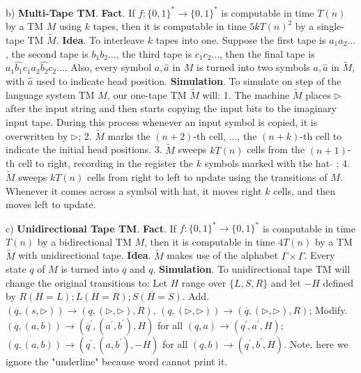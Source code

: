 \documentclass[10pt,a4paper]{article}
\begin{document}
b) \textbf{Multi-Tape TM}.
\textbf{Fact}. If \(f:\{0,1\}^{*} \to \{0,1\}^{*}\) is computable in time \(T(n)\) by a TM \(M\) using \(k\) tapes, then it is computable in time \(5k T(n)^2\) by a single-tape TM \(\tilde{M}\).
\textbf{Idea}. To interleave \(k\) tapes into one. Suppose the first tape is \(a_1 a_2 ...\), the second tape is \(b_1 b_2 ...\), the third tape is \(c_1 c_2 ...\), then the final tape is \(a_1 \hat{b_1} c_1 a_2 \hat{b_2} c_2 ...\). Also, every symbol \(a, \hat{a}\) in \(M\) is turned into two symbols \(a, \hat{a}\) in \(\tilde{M}\), with \(\hat{a}\) used to indicate head position.
\textbf{Simulation}. To simulate on step of the language system TM \(M\), our one-tape TM \(\tilde{M}\) will:
    1. The machine \(\tilde{M}\) places \(\triangleright\) after the input string and then starts copying the input bits to the imaginary input tape. During this process whenever an input symbol is copied, it is overwritten by \(\triangleright\);
    2. \(\tilde{M}\) marks the \((n + 2)\)-th cell, ..., the \((n + k)\)-th cell to indicate the initial head positions.
    3. \(\tilde{M}\) sweeps \(kT(n)\) cells from the \((n + 1)\)-th cell to right, recording in the register the \(k\) symbols marked with the hat \(\hat{}\) ;
    4. \(\tilde{M}\) sweeps \(kT(n)\) cells from right to left to update using the transitions of \(M\). Whenever it comes across a symbol with hat, it moves right \(k\) cells, and then moves left to update.

c) \textbf{Unidirectional Tape TM}.
\textbf{Fact}. If \(f:\{0,1\}^{*} \to \{0,1\}^{*}\) is computable in time \(T(n)\) by a bidirectional TM \(M\), then it is computable in time \(4T(n)\) by a TM \(\tilde{M}\) with unidirectional tape.
\textbf{Idea}. \(\tilde{M}\) makes use of the alphabet \(\Gamma \times \Gamma\). Every state \(q\) of \(M\) is turned into \(\overline{q}\) and \(q\).
\textbf{Simulation}. To unidirectional tape TM will change the original transitions to:
Let \(H\) range over \(\{L,S,R\}\) and let \(-H\) defined by \(R (H = L); L (H = R); S (H = S)\).
Add. \((\overline{q}, (s,\triangleright)) \to (q, (\triangleright,\triangleright), R)\), \((q, (\triangleright,\triangleright)) \to (\overline{q}, (\triangleright,\triangleright), R)\);
Modify. \((\overline{q}, (a,b)) \to (\overline{q}^{\prime}, (a^{\prime},b^{\prime}), H)\) for all \((q,a) \to (q^{\prime}, a^{\prime}, H)\);
\((q,(a,b)) \to (q^{\prime}, (a,b^{\prime}), -H)\) for all \((q,b) \to (q^{\prime}, b^{\prime}, H)\).
Note. here we ignore the "underline" because word cannot print it.
\end{document}

